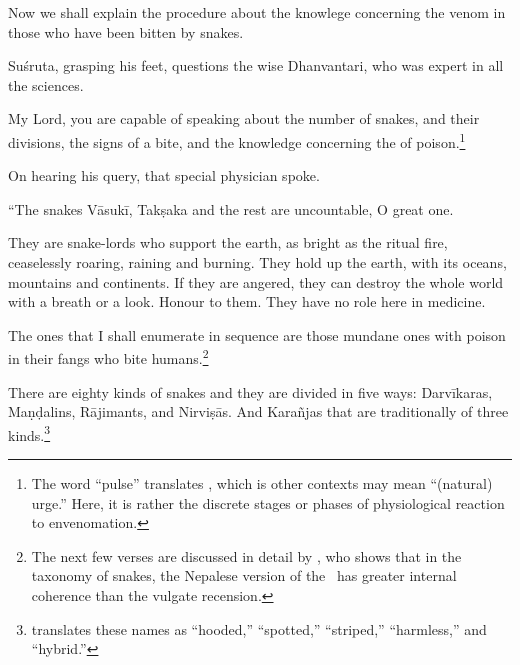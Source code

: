 \begin{translation}
    \item[1] Now we shall explain the procedure about the knowlege 
    concerning the venom in those who have been bitten by snakes. 
    
    \item[3] Suśruta, grasping his feet, questions the wise Dhanvantari, who was 
    expert in all the sciences.
    
    \item[4]
    
    My Lord, you are capable of speaking about the number of snakes, and their 
    divisions, the signs of a bite, and the knowledge concerning the 
     of poison.\footnote{The word “pulse” translates , 
    which is other contexts may mean “(natural) urge.”  Here, it is rather the 
    discrete stages or phases of physiological reaction to envenomation.}
        
    \item[5]
    
    On hearing his query, that special physician spoke.
    
    “The snakes Vāsukī, Takṣaka and the rest are uncountable, O great 
    one.
    
\item[6--9ab]

They are snake-lords who support the earth, as bright as the ritual fire,
ceaselessly roaring, raining and burning. They hold up the earth, with its
oceans, mountains and continents. If they are angered, they can destroy the whole 
world with a breath or a look.  Honour to them. They have no role here in medicine. 

The ones that I shall enumerate in sequence are those mundane ones with
poison in their fangs who bite humans.\footnote{The next few verses are
    discussed in detail by \citet[101--104]{hari-2011}, who shows that in the
    taxonomy of snakes, the Nepalese version of the \SS\ has greater internal
    coherence than the vulgate recension.}

\item[9cd--10]    

There are eighty kinds of snakes and they are divided in five ways:
Darvīkaras, Maṇḍalins, Rājimants, and Nirviṣās.  And Karañjas that are
traditionally of three kinds.\footnote{\citet{hari-2011} translates these
    names as “hooded,” “spotted,” “striped,” “harmless,” and “hybrid.”}
\end{translation}

